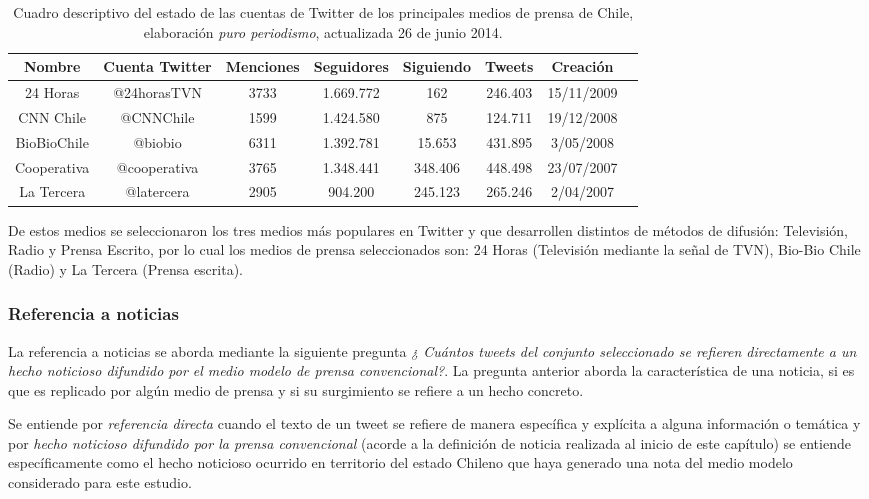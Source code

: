 \begin{table}[h]
	\centering
	\begin{tabular}{| c | c | c | c | c | c | c | c|}
		\hline
		Nombre & Cuenta Twitter & Menciones & Seguidores & Siguiendo & Tweets & Creación \\ \hline
		24 Horas	& @24horasTVN & 3733 & 1.669.772 & 162	& 246.403	& 15/11/2009 \\ \hline
		CNN Chile	& @CNNChile	& 1599 & 1.424.580 & 875 & 124.711	&	19/12/2008	\\ \hline
		BioBioChile	& @biobio & 6311 & 1.392.781 &	15.653	& 431.895	&	3/05/2008\\ \hline
		Cooperativa	& @cooperativa & 3765 &	1.348.441 & 348.406	& 448.498 & 23/07/2007\\ \hline
		La Tercera	& @latercera & 2905 & 904.200 &	245.123 & 265.246 & 2/04/2007\\ \hline
		\hline
	\end{tabular}
	\caption {Cuadro descriptivo del estado de las cuentas de Twitter de los principales medios de prensa de Chile, elaboración \emph{puro periodismo}, actualizada 26 de junio 2014.}
\end{table}

De estos medios se seleccionaron los tres medios más populares en Twitter y que desarrollen distintos de métodos de difusión: Televisión, Radio y Prensa Escrito, por lo cual los medios de prensa seleccionados son: 24 Horas (Televisión mediante la señal de TVN), Bio-Bio Chile (Radio) y La Tercera (Prensa escrita). 

\subsubsection{Referencia a noticias}

La referencia a noticias se aborda mediante la siguiente pregunta \emph{¿ Cuántos tweets del conjunto seleccionado se refieren directamente a un hecho noticioso difundido por el medio modelo de prensa convencional?}. La pregunta anterior aborda la característica de una noticia, si es que es replicado por algún medio de prensa y si su surgimiento se refiere a un hecho concreto.

Se entiende por \emph{referencia directa} cuando el texto de un tweet se refiere de manera específica y explícita a alguna información o temática y por \emph{hecho noticioso difundido por la prensa convencional} (acorde a la definición de noticia realizada al inicio de este capítulo) se entiende específicamente como el hecho noticioso ocurrido en territorio del estado Chileno que haya generado una nota del medio modelo considerado para este estudio.

